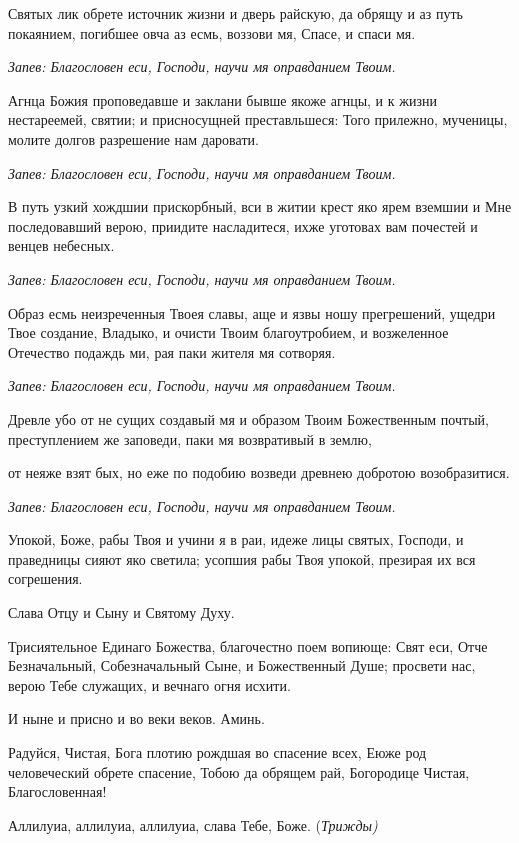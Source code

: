    Святых лик обрете источник жизни и дверь райскую, да обрящу и аз
путь покаянием, погибшее овча аз есмь, воззови мя, Спасе, и спаси
мя.


 \itshape Запев:\normalfont{} Благословен еси, Господи, научи мя оправданием Твоим.


   Агнца Божия проповедавше и заклани бывше якоже агнцы, и к жизни
нестареемей, святии; и присносущней преставльшеся: Того прилежно,
мученицы, молите долгов разрешение нам даровати.


 \itshape Запев:\normalfont{} Благословен еси, Господи, научи мя оправданием Твоим.


   В путь узкий хождшии прискорбный, вси в житии крест яко ярем
вземшии и Мне последовавший верою, приидите насладитеся, ихже уготовах
вам почестей и венцев небесных.


 \itshape Запев:\normalfont{} Благословен еси, Господи, научи мя оправданием Твоим.


   Образ есмь неизреченныя Твоея славы, аще и язвы ношу прегрешений,
ущедри Твое создание, Владыко, и очисти Твоим благоутробием, и
возжеленное Отечество подаждь ми, рая паки жителя мя сотворяя.


 \itshape Запев:\normalfont{} Благословен еси, Господи, научи мя оправданием Твоим.


   Древле убо от не сущих создавый мя и образом Твоим Божественным
почтый, преступлением же заповеди, паки мя возвративый в землю,

от неяже взят бых, но еже по подобию возведи древнею добротою
возобразитися.


 \itshape Запев:\normalfont{} Благословен еси, Господи, научи мя оправданием Твоим.


   Упокой, Боже, рабы Твоя и учини я в раи, идеже лицы святых, Господи,
и праведницы сияют яко светила; усопшия рабы Твоя упокой, презирая их
вся согрешения.


   Слава Отцу и Сыну и Святому Духу.


   Трисиятельное Единаго Божества, благочестно поем вопиюще: Свят еси,
Отче Безначальный, Собезначальный Сыне, и Божественный Душе; просвети
нас, верою Тебе служащих, и вечнаго огня исхити.


   И ныне и присно и во веки веков. Аминь.


   Радуйся, Чистая, Бога плотию рождшая во спасение всех, Еюже род
человеческий обрете спасение, Тобою да обрящем рай, Богородице Чистая,
Благословенная!


   Аллилуиа, аллилуиа, аллилуиа, слава Тебе, Боже. (\itshape  Трижды\normalfont{})


